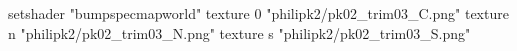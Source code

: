 setshader "bumpspecmapworld"
    texture 0 "philipk2/pk02_trim03_C.png"
    texture n "philipk2/pk02_trim03_N.png"
    texture s "philipk2/pk02_trim03_S.png"